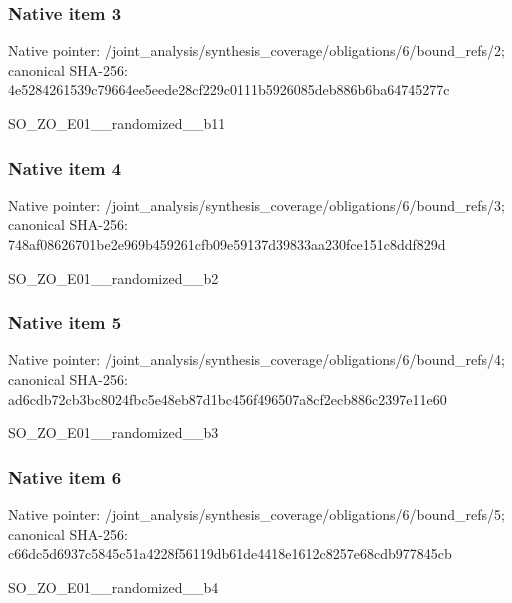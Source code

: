 \documentclass[10pt,a4paper]{article}
\begin{document}
\subsubsection{Native item 3}
Native pointer: /joint\_\allowbreak{}analysis/synthesis\_\allowbreak{}coverage/obligations/6/bound\_\allowbreak{}refs/2; canonical SHA-256: 4e5284261539c79664ee5eede28cf229c0111b5926085deb886b6ba64745277c

\begingroup\raggedright\sloppy SO\_\allowbreak{}ZO\_\allowbreak{}E01\_\allowbreak{}\_\allowbreak{}randomized\_\allowbreak{}\_\allowbreak{}b11\par\endgroup

\subsubsection{Native item 4}
Native pointer: /joint\_\allowbreak{}analysis/synthesis\_\allowbreak{}coverage/obligations/6/bound\_\allowbreak{}refs/3; canonical SHA-256: 748af08626701be2e969b459261cfb09e59137d39833aa230fce151c8ddf829d

\begingroup\raggedright\sloppy SO\_\allowbreak{}ZO\_\allowbreak{}E01\_\allowbreak{}\_\allowbreak{}randomized\_\allowbreak{}\_\allowbreak{}b2\par\endgroup

\subsubsection{Native item 5}
Native pointer: /joint\_\allowbreak{}analysis/synthesis\_\allowbreak{}coverage/obligations/6/bound\_\allowbreak{}refs/4; canonical SHA-256: ad6cdb72cb3bc8024fbc5e48eb87d1bc456f496507a8cf2ecb886c2397e11e60

\begingroup\raggedright\sloppy SO\_\allowbreak{}ZO\_\allowbreak{}E01\_\allowbreak{}\_\allowbreak{}randomized\_\allowbreak{}\_\allowbreak{}b3\par\endgroup

\subsubsection{Native item 6}
Native pointer: /joint\_\allowbreak{}analysis/synthesis\_\allowbreak{}coverage/obligations/6/bound\_\allowbreak{}refs/5; canonical SHA-256: c66dc5d6937c5845c51a4228f56119db61de4418e1612c8257e68cdb977845cb

\begingroup\raggedright\sloppy SO\_\allowbreak{}ZO\_\allowbreak{}E01\_\allowbreak{}\_\allowbreak{}randomized\_\allowbreak{}\_\allowbreak{}b4\par\endgroup
\end{document}
